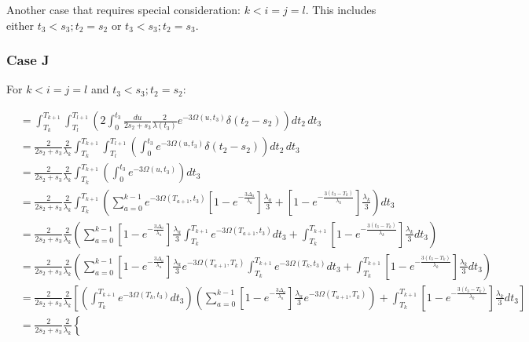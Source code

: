 \documentclass{article}
\begin{document}
Another case that requires special consideration: $k<i=j=l$. This includes
either $t_3<s_3;t_2=s_2$ or $t_3<s_3;t_2=s_3$.

\subsubsection{Case J}
For $k<i=j=l$ and $t_3<s_3;t_2=s_2$:

\begin{align*}
    &=\int_{T_k}^{T_{k+1}}\int_{T_l}^{T_{l+1}}\left(
    2\int_0^{t_3}\frac{du}{2s_2+s_3}\frac{2}{\lambda(t_3)}e^{-3\Omega(u,t_3)}\delta(t_2-s_2)
    \right)dt_2\,dt_3\\
    &=\frac{2}{2s_2+s_3}\frac{2}{\lambda_k}\int_{T_k}^{T_{k+1}}\int_{T_l}^{T_{l+1}}\left(
    \int_0^{t_3}e^{-3\Omega(u,t_3)}\delta(t_2-s_2)
    \right)dt_2\,dt_3\\
    &=\frac{2}{2s_2+s_3}\frac{2}{\lambda_k}\int_{T_k}^{T_{k+1}}\left(
    \int_0^{t_3}e^{-3\Omega(u,t_3)}
    \right)dt_3\\
    &=\frac{2}{2s_2+s_3}\frac{2}{\lambda_k}\int_{T_k}^{T_{k+1}}\left(
    \sum_{a=0}^{k-1} e^{-3\Omega(T_{a+1},t_3)}
    \left[1-e^{-\frac{3 \Delta_a}{\lambda_a}}\right]\frac{\lambda_a}{3}+
    \left[1-e^{-\frac{3\left(t_3-T_{k}\right)}{\lambda_{k}}}\right]\frac{\lambda_{k}}{3}
    \right)dt_3\\
    &=\frac{2}{2s_2+s_3}\frac{2}{\lambda_k}\left(
    \sum_{a=0}^{k-1} 
    \left[1-e^{-\frac{3 \Delta_a}{\lambda_a}}\right]\frac{\lambda_a}{3}\int_{T_k}^{T_{k+1}}e^{-3\Omega(T_{a+1},t_3)}dt_3+
    \int_{T_k}^{T_{k+1}}\left[1-e^{-\frac{3\left(t_3-T_{k}\right)}{\lambda_{k}}}\right]\frac{\lambda_{k}}{3}dt_3
    \right)\\
    &=\frac{2}{2s_2+s_3}\frac{2}{\lambda_k}\left(
    \sum_{a=0}^{k-1} 
    \left[1-e^{-\frac{3 \Delta_a}{\lambda_a}}\right]\frac{\lambda_a}{3}e^{-3\Omega(T_{a+1},T_k)}\int_{T_k}^{T_{k+1}}e^{-3\Omega(T_k,t_3)}dt_3+
    \int_{T_k}^{T_{k+1}}\left[1-e^{-\frac{3\left(t_3-T_{k}\right)}{\lambda_{k}}}\right]\frac{\lambda_{k}}{3}dt_3
    \right)\\
    &=\frac{2}{2s_2+s_3}\frac{2}{\lambda_k}\left[
    \left(\int_{T_k}^{T_{k+1}}e^{-3\Omega(T_k,t_3)}dt_3\right)
    \left(\sum_{a=0}^{k-1} 
    \left[1-e^{-\frac{3 \Delta_a}{\lambda_a}}\right]\frac{\lambda_a}{3}e^{-3\Omega(T_{a+1},T_k)}\right)+
    \int_{T_k}^{T_{k+1}}\left[1-e^{-\frac{3\left(t_3-T_{k}\right)}{\lambda_{k}}}\right]\frac{\lambda_{k}}{3}dt_3
    \right]\\
    &=\frac{2}{2s_2+s_3}\frac{2}{\lambda_k}\left\{

\end{align*}
\end{document}
